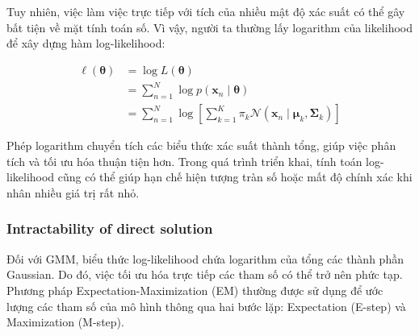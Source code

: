 \documentclass[12pt,a4paper]{article}
\begin{document}
Tuy nhiên, việc làm việc trực tiếp với tích của nhiều
mật độ xác suất có thể gây bất tiện về mặt tính toán số.
Vì vậy, người ta thường lấy logarithm của likelihood
để xây dựng hàm log-likelihood:

\begin{align}
\ell(\boldsymbol{\theta})
&= \log L(\boldsymbol{\theta})\\
&= \sum_{n=1}^{N}
\log p(\bm{x}_n\mid\boldsymbol{\theta})\\
&= \sum_{n=1}^{N}
\log\left[
\sum_{k=1}^{K}
\pi_k
\mathcal{N}(\bm{x}_n\mid
\bm{\mu}_k,\boldsymbol{\Sigma}_k)
\right]
\end{align}

Phép logarithm chuyển tích các biểu thức xác suất thành
tổng, giúp việc phân tích và tối ưu hóa thuận tiện hơn.
Trong quá trình triển khai, tính toán log-likelihood
cũng có thể giúp hạn chế hiện tượng tràn số hoặc mất độ
chính xác khi nhân nhiều giá trị rất nhỏ.

\subsubsection*{Intractability of direct solution}

Đối với GMM, biểu thức log-likelihood chứa logarithm
của tổng các thành phần Gaussian. Do đó, việc tối ưu hóa
trực tiếp các tham số có thể trở nên phức tạp.
Phương pháp Expectation-Maximization (EM) thường được
sử dụng để ước lượng các tham số của mô hình thông qua
hai bước lặp: Expectation (E-step) và Maximization
(M-step).
\end{document}
